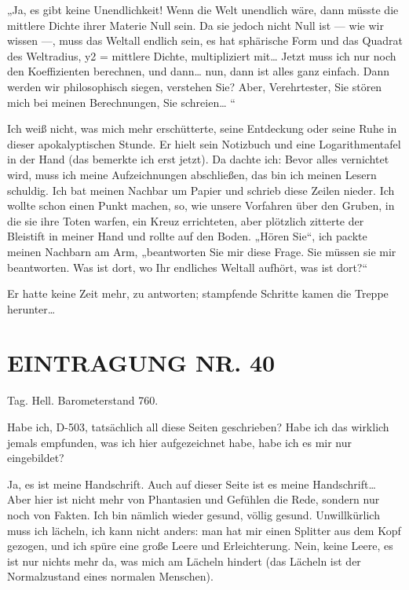 „Ja, es gibt keine Unendlichkeit! Wenn die Welt unendlich wäre,
dann müsste die mittlere Dichte ihrer Materie Null sein. Da sie
jedoch nicht Null ist — wie wir wissen —, muss das Weltall endlich
sein, es hat sphärische
Form und das Quadrat des Weltradius, y2 = mittlere Dichte,
multipliziert mit\ldots{} Jetzt muss ich nur noch den Koeffizienten
berechnen, und dann\ldots{} nun, dann ist alles ganz einfach. Dann
werden wir philosophisch siegen, verstehen Sie? Aber, Verehrtester,
Sie stören mich bei meinen Berechnungen, Sie schreien\ldots{} “

Ich weiß nicht, was mich mehr erschütterte, seine Entdeckung oder
seine Ruhe in dieser apokalyptischen Stunde. Er hielt sein
Notizbuch und eine Logarithmentafel in der Hand (das bemerkte ich
erst jetzt). Da dachte ich: Bevor alles vernichtet wird, muss ich
meine Aufzeichnungen abschließen, das bin ich meinen Lesern
schuldig. Ich bat meinen Nachbar um Papier und schrieb diese Zeilen
nieder. Ich wollte schon einen Punkt machen, so, wie unsere
Vorfahren über den Gruben, in die sie ihre Toten warfen, ein Kreuz
errichteten, aber plötzlich zitterte der Bleistift in meiner Hand
und rollte auf den Boden. „Hören Sie“, ich packte meinen Nachbarn
am Arm, „beantworten Sie mir diese Frage. Sie müssen sie mir
beantworten. Was ist dort, wo Ihr endliches Weltall aufhört, was
ist dort?“

Er hatte keine Zeit mehr, zu antworten; stampfende Schritte kamen
die Treppe herunter\ldots{}

\section{EINTRAGUNG NR. 40}

Tag. Hell. Barometerstand 760.

Habe ich, D-503, tatsächlich all diese Seiten geschrieben? Habe ich
das wirklich jemals empfunden, was ich hier aufgezeichnet habe,
habe ich es mir nur eingebildet?

Ja, es ist meine Handschrift. Auch auf dieser Seite ist es meine
Handschrift\ldots{} Aber hier ist nicht mehr von Phantasien und Gefühlen
die Rede, sondern nur noch von Fakten. Ich bin nämlich wieder
gesund, völlig gesund. Unwillkürlich muss ich lächeln, ich kann
nicht anders: man hat mir einen Splitter aus dem Kopf gezogen, und
ich spüre eine große Leere und Erleichterung. Nein, keine Leere, es
ist nur nichts mehr da, was mich am Lächeln hindert (das Lächeln
ist der Normalzustand eines normalen Menschen).

